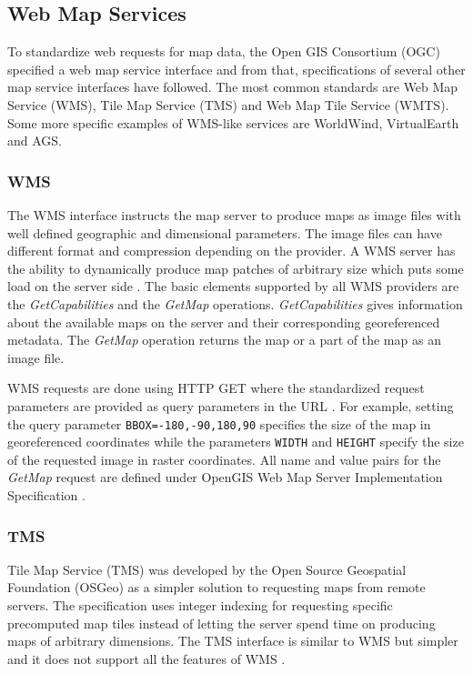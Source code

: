 \subsection{Web Map Services}

To standardize web requests for map data, the Open GIS Consortium (OGC) specified a web map service interface \cite{wms06} and from that, specifications of several other map service interfaces have followed. The most common standards are Web Map Service (WMS), Tile Map Service (TMS) and Web Map Tile Service (WMTS). Some more specific examples of WMS-like services are WorldWind, VirtualEarth and AGS.

\subsubsection{WMS}

The WMS interface instructs the map server to produce maps as image files with well defined geographic and dimensional parameters. The image files can have different format and compression depending on the provider. A WMS server has the ability to dynamically produce map patches of arbitrary size which puts some load on the server side \cite{wms06}. The basic elements supported by all WMS providers are the \emph{GetCapabilities} and the \emph{GetMap} operations. \emph{GetCapabilities} gives information about the available maps on the server and their corresponding georeferenced metadata. The \emph{GetMap} operation returns the map or a part of the map as an image file.

WMS requests are done using HTTP GET where the standardized request parameters are provided as query parameters in the URL \cite{wms06}. For example, setting the query parameter \texttt{BBOX=-180,-90,180,90} specifies the size of the map in georeferenced coordinates while the parameters \texttt{WIDTH} and \texttt{HEIGHT} specify the size of the requested image in raster coordinates. All name and value pairs for the \emph{GetMap} request are defined under OpenGIS Web Map Server Implementation Specification \cite{wms06}.

\subsubsection{TMS}

Tile Map Service (TMS) was developed by the Open Source Geospatial Foundation (OSGeo) as a simpler solution to requesting maps from remote servers. The specification uses integer indexing for requesting specific precomputed map tiles instead of letting the server spend time on producing maps of arbitrary dimensions. The TMS interface is similar to WMS but simpler and it does not support all the features of WMS \cite{tms}.

